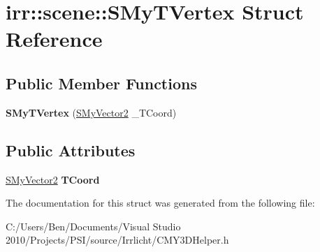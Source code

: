 \hypertarget{structirr_1_1scene_1_1_s_my_t_vertex}{\section{irr\-:\-:scene\-:\-:S\-My\-T\-Vertex Struct Reference}
\label{structirr_1_1scene_1_1_s_my_t_vertex}
}
\subsection*{Public Member Functions}
\begin{DoxyCompactItemize}
\item 
\hypertarget{structirr_1_1scene_1_1_s_my_t_vertex_aa8bb0b60b5ba3909ca934d3748c6cae6}{{\bfseries S\-My\-T\-Vertex} (\hyperlink{structirr_1_1scene_1_1_s_my_vector2}{S\-My\-Vector2} \-\_\-\-T\-Coord)}\label{structirr_1_1scene_1_1_s_my_t_vertex_aa8bb0b60b5ba3909ca934d3748c6cae6}

\end{DoxyCompactItemize}
\subsection*{Public Attributes}
\begin{DoxyCompactItemize}
\item 
\hypertarget{structirr_1_1scene_1_1_s_my_t_vertex_a883ce2d541a6019031ac6d295395af1f}{\hyperlink{structirr_1_1scene_1_1_s_my_vector2}{S\-My\-Vector2} {\bfseries T\-Coord}}\label{structirr_1_1scene_1_1_s_my_t_vertex_a883ce2d541a6019031ac6d295395af1f}

\end{DoxyCompactItemize}


The documentation for this struct was generated from the following file\-:\begin{DoxyCompactItemize}
\item 
C\-:/\-Users/\-Ben/\-Documents/\-Visual Studio 2010/\-Projects/\-P\-S\-I/source/\-Irrlicht/C\-M\-Y3\-D\-Helper.\-h\end{DoxyCompactItemize}
